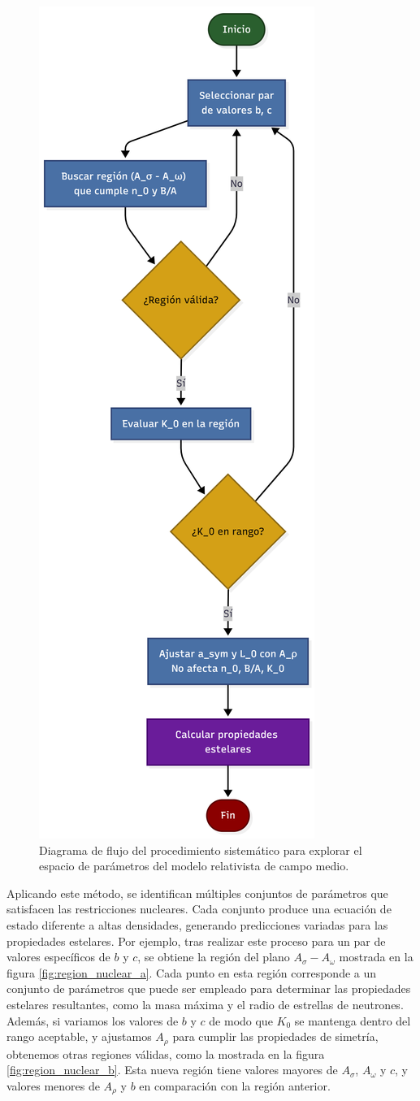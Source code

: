 \begin{figure}
	\centering
	\includegraphics[width=.38\linewidth]{Figuras/flowchart_metodo}
	\caption[Diagrama de flujo del método de exploración del espacio de parámetros]{Diagrama de flujo del procedimiento sistemático para explorar el espacio de parámetros del modelo relativista de campo medio.}
	\label{fig:flowchartmetodo}
\end{figure}

Aplicando este método, se identifican múltiples conjuntos de parámetros que satisfacen las restricciones nucleares. Cada conjunto produce una ecuación de estado diferente a altas densidades, generando predicciones variadas para las propiedades estelares. Por ejemplo, tras realizar este proceso para un par de valores específicos de $b$ y $c$, se obtiene la región del plano $A_\sigma - A_\omega$ mostrada en la figura \ref{fig:region_nuclear_a}. Cada punto en esta región corresponde a un conjunto de parámetros que puede ser empleado para determinar las propiedades estelares resultantes, como la masa máxima y el radio de estrellas de neutrones. Además, si variamos los valores de $b$ y $c$ de modo que $K_0$ se mantenga dentro del rango aceptable, y ajustamos $A_\rho$ para cumplir las propiedades de simetría, obtenemos otras regiones válidas, como la mostrada en la figura \ref{fig:region_nuclear_b}. Esta nueva región tiene valores mayores de $A_\sigma$, $A_\omega$ y $c$, y valores menores de $A_\rho$ y $b$ en comparación con la región anterior.  

